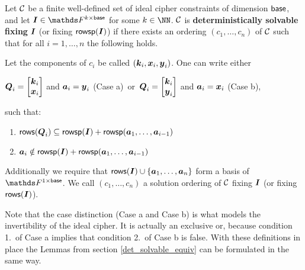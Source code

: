 \begin{defn}
\label{def_det_solvable_ic}
    Let $\mathcal{C}$ be a finite well-defined set of ideal cipher constraints of dimension $\mathsf{base}$,
    and let $\I \in \F^{k \times \base}$ for some $k \in \NN$.
    $\mathcal{C}$ is \textbf{deterministically solvable fixing} $\boldsymbol{I}$ (or fixing $\mathsf{rowsp}(\boldsymbol{I})$)
    if there exists an ordering $(c_1, \dots, c_n)$ of $\mathcal{C}$
    such that for all $i=1, \dots, n$ the following holds.
    
    Let the components of $c_i$ be called $(\boldsymbol k_i, \boldsymbol x_i, \boldsymbol y_i)$.
    One can write either
    \vspace{-4mm}
    \begin{center}
    $\Q_i = \m{\vk_i \\ \vx_i}$ and $\boldsymbol a_i = \boldsymbol y_i$ (Case a) \,or\,
    $\Q_i = \m{\vk_i \\ \vy_i}$ and $\boldsymbol a_i = \boldsymbol x_i$ (Case b),
    \end{center}
    \vspace{-4mm}
    such that:
    
    \begin{enumerate}
    \item
        \label{solvable1_ic}
        $\mathsf{rows}(\boldsymbol{Q}_i) \subseteq \mathsf{rowsp}(\boldsymbol{I}) + \mathsf{rowsp}(\boldsymbol a_1, \dots, \boldsymbol a_{i-1} )$
    \item
        \label{solvable2_ic}
        $\boldsymbol a_i \notin \mathsf{rowsp}(\boldsymbol{I}) + \mathsf{rowsp}(\boldsymbol a_1, \dots, \boldsymbol a_{i-1} )$
    \end{enumerate}
    Additionally we require that $\mathsf{rows}(\boldsymbol{I}) \cup \{\boldsymbol a_1, \dots, \boldsymbol a_n\}$ form a basis of $\F^{1\times\base}$.
    We call $(c_1, \dots, c_n)$ a solution ordering of $\mathcal{C}$ fixing $\boldsymbol{I}$ (or fixing $\mathsf{rows}(\boldsymbol{I})$).
\end{defn}

Note that the case distinction (Case a and Case b) is what models the invertibility of the ideal cipher.
It is actually an exclusive or,
because condition 1.~of Case a implies that condition 2.~of Case b is false.
With these definitions in place the Lemmas from section \ref{det_solvable_equiv} can be formulated in the same way.

